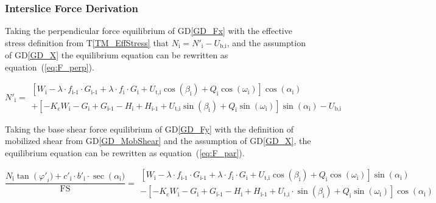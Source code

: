 \documentclass[12pt]{article}
\newcommand{\tref}[1]{T\ref{#1}}
\newcommand{\dref}[1]{GD\ref{#1}}
\begin{document}
\subsubsection*{Interslice Force Derivation} \label{sec:Ederivation}

Taking the perpendicular force equilibrium of \dref{GD_Fx} with the
effective stress definition from \tref{TM_EffStress} that
$N_{\text{i}}=N'_{\text{i}} - U_{\text{b,i}}$, and the assumption of
\dref{GD_X} the equilibrium equation can be rewritten as
equation~(\ref{eq:F_perp}).

\begin{equation}\label{eq:F_perp}   N'_{\text{i}}  = \begin{array}{l}    
    \left[ W_{\text{i}} - \lambda \cdot f_{\text{i-1}} \cdot
      G_{\text{i-1}} + \lambda \cdot f_{\text{i}} \cdot G_{\text{i}} +
      U_{\text{t,i}} {\cos\left(\beta_{\text{i}}\right)} +
      Q_{\text{i}} \cos\left(\omega_{\text{i}}\right)
      \right]\cos\left(\alpha_{\text{i}}\right) \\ + \left[
      -K_{\text{c}} W_{\text{i}} - G_{\text{i}} + G_{\text{i-1}} -
      H_{\text{i}} + H_{\text{i-1}} + U_{\text{t,i}}
      \sin\left(\beta_{\text{i}}\right) + Q_{\text{i}}
      \sin\left(\omega_{\text{i}}\right) \right]
    \sin\left(\alpha_{\text{i}}\right) - U_{\text{b,i}} \end{array}
\end{equation}

\noindent
Taking the base shear force equilibrium of \dref{GD_Fy} with the
definition of mobilized shear from \dref{GD_MobShear} and the assumption
of \dref{GD_X}, the equilibrium equation can be rewritten as
equation~(\ref{eq:F_par}).


\begin{equation}  \label{eq:F_par}
  \frac{
   N_{\text{i}} \tan\left(\varphi'\right._{i}) + c'_{\text{i}} \cdot b'_{\text{i}} \cdot \sec\left(\alpha_{\text{i}}\right.) 
  }
    { \text{FS} }
     = \begin{array}{l}
      \left[ W_{\text{i}}
       - \lambda \cdot
    
      f_{\text{i-1}} \cdot G_{\text{i-1}} + \lambda \cdot f_{\text{i}}
      \cdot G_{\text{i}} + U_{\text{t,i}}
      \cos\left(\beta_{\text{i}}\right) + Q_{\text{i}}
      \cos\left(\omega_{\text{i}}\right) \right]
    \sin\left(\alpha_{\text{i}}\right) \\ - \left[ -K_{\text{c}}
      W_{\text{i}} - G_{\text{i}} + G_{\text{i-1}} - H_{\text{i}} +
      H_{\text{i-1}} + U_{\text{t,i}} \cdot
      \sin\left(\beta_{\text{i}}\right) + Q_{\text{i}}
      \sin\left(\omega_{\text{i}}\right) \right]
    \cos\left(\alpha_{\text{i}}\right) \end{array}
\end{equation}
\end{document}
